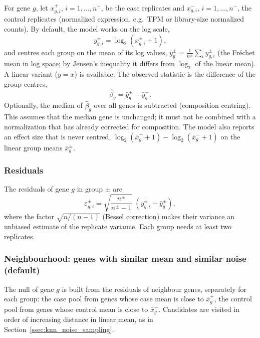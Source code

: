             For gene $g$, let $x^{+}_{g,i}$, $i = 1,\ldots,n^{+}$, be the case replicates and $x^{-}_{g,i}$, $i = 1,\ldots,n^{-}$, the control replicates (normalized expression, e.g.\ TPM or library-size normalized counts). By default, the model works on the log scale,
            \[
                y^{\pm}_{g,i} = \log_2\!\left(x^{\pm}_{g,i} + 1\right),
            \]
            and centres each group on the mean of its log values, $\bar{y}^{\pm}_{g} = \frac{1}{n^{\pm}} \sum_i y^{\pm}_{g,i}$ (the Fr\'echet mean in log space; by Jensen's inequality it differs from $\log_2$ of the linear mean). A linear variant ($y = x$) is available. The observed statistic is the difference of the group centres,
            \[
                \hat\beta_g = \bar{y}^{+}_{g} - \bar{y}^{-}_{g}.
            \]
            Optionally, the median of $\hat\beta_g$ over all genes is subtracted (composition centring). This assumes that the median gene is unchanged; it must not be combined with a normalization that has already corrected for composition. The model also reports an effect size that is never centred, $\log_2(\bar{x}^{+}_{g} + 1) - \log_2(\bar{x}^{-}_{g} + 1)$ on the linear group means $\bar{x}^{\pm}_{g}$.

        \subsubsection{Residuals}

            The residuals of gene $g$ in group $\pm$ are
            \[
                \varepsilon^{\pm}_{g,i} = \sqrt{\frac{n^{\pm}}{n^{\pm} - 1}}\;\left(y^{\pm}_{g,i} - \bar{y}^{\pm}_{g}\right),
            \]
            where the factor $\sqrt{n/(n-1)}$ (Bessel correction) makes their variance an unbiased estimate of the replicate variance. Each group needs at least two replicates.

        \subsubsection{Neighbourhood: genes with similar mean and similar noise (default)}\label{sssec:noise_de_vband}

            The null of gene $g$ is built from the residuals of neighbour genes, separately for each group: the case pool from genes whose case mean is close to $\bar{x}^{+}_{g}$, the control pool from genes whose control mean is close to $\bar{x}^{-}_{g}$. Candidates are visited in order of increasing distance in linear mean, as in Section~\ref{ssec:knn_noise_sampling}.

